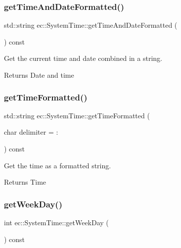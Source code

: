 \subsubsection{\texorpdfstring{get\+Time\+And\+Date\+Formatted()}{getTimeAndDateFormatted()}}
{\footnotesize\ttfamily std\+::string ec\+::\+System\+Time\+::get\+Time\+And\+Date\+Formatted (\begin{DoxyParamCaption}{ }\end{DoxyParamCaption}) const}



Get the current time and date combined in a string. 

\begin{DoxyReturn}{Returns}
Date and time 
\end{DoxyReturn}
\mbox{\label{classec_1_1_system_time_aa66b5939fa20b202accd79ac150c4c1b}} 
\subsubsection{\texorpdfstring{get\+Time\+Formatted()}{getTimeFormatted()}}
{\footnotesize\ttfamily std\+::string ec\+::\+System\+Time\+::get\+Time\+Formatted (\begin{DoxyParamCaption}\item[{char}]{delimiter = {\ttfamily \textquotesingle{}\+:\textquotesingle{}} }\end{DoxyParamCaption}) const}



Get the time as a formatted string. 

\begin{DoxyReturn}{Returns}
Time 
\end{DoxyReturn}
\mbox{\label{classec_1_1_system_time_adba0a134cb5e208f98cdba4da6cde675}} 
\subsubsection{\texorpdfstring{get\+Week\+Day()}{getWeekDay()}}
{\footnotesize\ttfamily int ec\+::\+System\+Time\+::get\+Week\+Day (\begin{DoxyParamCaption}{ }\end{DoxyParamCaption}) const}



